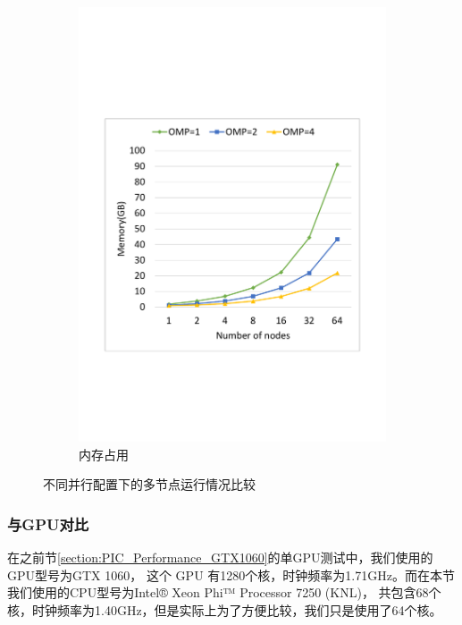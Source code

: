 \begin{figure}[!htb]
\begin{subfigure}[b]{0.48\textwidth}
        \includegraphics[width=\textwidth]{Img/PIC_speedup_Cori_multi_nodes_memory.pdf}
        \caption{内存占用}
    \end{subfigure}
    \caption{不同并行配置下的多节点运行情况比较}
    \label{fig:PIC_speedup_Cori_multi_nodes_timeMemory}
\end{figure}

\subsubsection{与GPU对比}

在之前节\eqref{section:PIC_Performance_GTX1060}的单GPU测试中，我们使用的GPU型号为GTX 1060，
这个 GPU 有1280个核，时钟频率为1.71GHz。而在本节我们使用的CPU型号为Intel® Xeon Phi™ Processor 7250 (KNL)，
共包含68个核，时钟频率为1.40GHz，但是实际上为了方便比较，我们只是使用了64个核。


